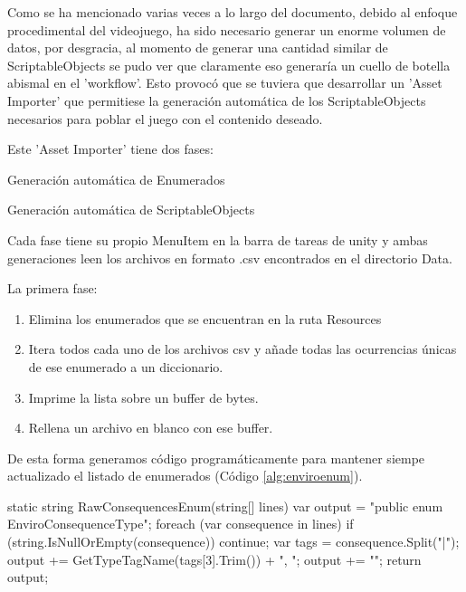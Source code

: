 Como se ha mencionado varias veces a lo largo del documento, debido al enfoque procedimental del videojuego, ha sido necesario generar un enorme volumen de datos, por desgracia, al momento de generar una cantidad similar de ScriptableObjects se pudo ver que claramente eso generaría un cuello de botella abismal en el 'workflow'. Esto provocó que se tuviera que desarrollar un 'Asset Importer' que permitiese la generación automática de los ScriptableObjects necesarios para poblar el juego con el contenido deseado.

Este 'Asset Importer' tiene dos fases:
\begin{compactitem}
    \item Generación automática de Enumerados
    \item Generación automática de ScriptableObjects
\end{compactitem}

Cada fase tiene su propio MenuItem en la barra de tareas de unity y ambas generaciones leen los archivos en formato .csv encontrados en el directorio \textunderscore Data. 

La primera fase:
\begin{enumerate}
    \item Elimina los enumerados que se encuentran en la ruta Resources
    \item Itera todos cada uno de los archivos csv y añade todas las ocurrencias únicas de ese enumerado a un diccionario.
    \item Imprime la lista sobre un buffer de bytes.
    \item Rellena un archivo en blanco con ese buffer.
\end{enumerate} 

De esta forma generamos código programáticamente para mantener siempe actualizado el listado de enumerados (Código \ref{alg:enviroenum}).

\begin{mypython}[caption={Código para autogenerar el enumerado de EnviroConsequences.},label={alg:enviroenum}]
static string RawConsequencesEnum(string[] lines)
{
    var output = "public enum EnviroConsequenceType{";
    foreach (var consequence in lines)
    {
        if (string.IsNullOrEmpty(consequence))
        {
            continue;
        }
        var tags = consequence.Split("|");
        output += GetTypeTagName(tags[3].Trim()) + ", ";
    }
    output += "}";
    return output;
}
\end{mypython}

